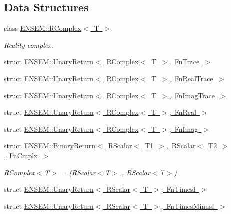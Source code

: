 \subsection*{Data Structures}
\begin{DoxyCompactItemize}
\item 
class \mbox{\hyperlink{classENSEM_1_1RComplex}{E\+N\+S\+E\+M\+::\+R\+Complex$<$ T $>$}}
\begin{DoxyCompactList}\small\item\em Reality complex. \end{DoxyCompactList}\item 
struct \mbox{\hyperlink{structENSEM_1_1UnaryReturn_3_01RComplex_3_01T_01_4_00_01FnTrace_01_4}{E\+N\+S\+E\+M\+::\+Unary\+Return$<$ R\+Complex$<$ T $>$, Fn\+Trace $>$}}
\item 
struct \mbox{\hyperlink{structENSEM_1_1UnaryReturn_3_01RComplex_3_01T_01_4_00_01FnRealTrace_01_4}{E\+N\+S\+E\+M\+::\+Unary\+Return$<$ R\+Complex$<$ T $>$, Fn\+Real\+Trace $>$}}
\item 
struct \mbox{\hyperlink{structENSEM_1_1UnaryReturn_3_01RComplex_3_01T_01_4_00_01FnImagTrace_01_4}{E\+N\+S\+E\+M\+::\+Unary\+Return$<$ R\+Complex$<$ T $>$, Fn\+Imag\+Trace $>$}}
\item 
struct \mbox{\hyperlink{structENSEM_1_1UnaryReturn_3_01RComplex_3_01T_01_4_00_01FnReal_01_4}{E\+N\+S\+E\+M\+::\+Unary\+Return$<$ R\+Complex$<$ T $>$, Fn\+Real $>$}}
\item 
struct \mbox{\hyperlink{structENSEM_1_1UnaryReturn_3_01RComplex_3_01T_01_4_00_01FnImag_01_4}{E\+N\+S\+E\+M\+::\+Unary\+Return$<$ R\+Complex$<$ T $>$, Fn\+Imag $>$}}
\item 
struct \mbox{\hyperlink{structENSEM_1_1BinaryReturn_3_01RScalar_3_01T1_01_4_00_01RScalar_3_01T2_01_4_00_01FnCmplx_01_4}{E\+N\+S\+E\+M\+::\+Binary\+Return$<$ R\+Scalar$<$ T1 $>$, R\+Scalar$<$ T2 $>$, Fn\+Cmplx $>$}}
\begin{DoxyCompactList}\small\item\em R\+Complex$<$\+T$>$ = (R\+Scalar$<$\+T$>$ , R\+Scalar$<$\+T$>$) \end{DoxyCompactList}\item 
struct \mbox{\hyperlink{structENSEM_1_1UnaryReturn_3_01RScalar_3_01T_01_4_00_01FnTimesI_01_4}{E\+N\+S\+E\+M\+::\+Unary\+Return$<$ R\+Scalar$<$ T $>$, Fn\+Times\+I $>$}}
\item 
struct \mbox{\hyperlink{structENSEM_1_1UnaryReturn_3_01RScalar_3_01T_01_4_00_01FnTimesMinusI_01_4}{E\+N\+S\+E\+M\+::\+Unary\+Return$<$ R\+Scalar$<$ T $>$, Fn\+Times\+Minus\+I $>$}}

\end{DoxyCompactItemize}

